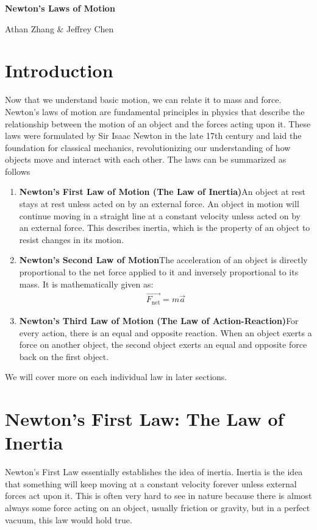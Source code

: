 \documentclass[11pt]{article}
\begin{document}
\textbf{\Huge Newton's Laws of Motion}

Athan Zhang \& Jeffrey Chen

\section{Introduction}

Now that we understand basic motion, we can relate it to mass and force. Newton's laws of motion are fundamental principles in physics that describe the relationship between the motion of an object and the forces acting upon it. These laws were formulated by Sir Isaac Newton in the late 17th century and laid the foundation for classical mechanics, revolutionizing our understanding of how objects move and interact with each other. The laws can be summarized as follows
\begin{enumerate}
    \item \textbf{Newton's First Law of Motion (The Law of Inertia)}\newline An object at rest stays at rest unless acted on by an external force. An object in motion will continue moving in a straight line at a constant velocity unless acted on by an external force. This describes inertia, which is the property of an object to resist changes in its motion.
    \item \textbf{Newton's Second Law of Motion}\newline The acceleration of an object is directly proportional to the net force applied to it and inversely proportional to its mass. It is mathematically given as:
    \begin{align*}
        \Vec{F_{\text{net}}} = m\Vec{a}
    \end{align*}
    \item \textbf{Newton's Third Law of Motion (The Law of Action-Reaction)}\newline For every action, there is an equal and opposite reaction. When an object exerts a force on another object, the second object exerts an equal and opposite force back on the first object.
\end{enumerate}

We will cover more on each individual law in later sections.

\section{Newton's First Law: The Law of Inertia}

Newton's First Law essentially establishes the idea of inertia. Inertia is the idea that something will keep moving at a constant velocity forever unless external forces act upon it. This is often very hard to see in nature because there is almost always some force acting on an object, usually friction or gravity, but in a perfect vacuum, this law would hold true. 
\end{document}
